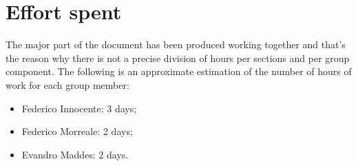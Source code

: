 \documentclass[../ATD.tex]{subfiles}
\begin{document}
    \chapter{Effort spent}\label{ch:effort-spent}
    The major part of the document has been produced working together and that’s the reason why there is not a precise division of hours per sections and per group component.
    The following is an approximate estimation of the number of hours of work for each group member:
    \begin{itemize}
        \item Federico Innocente: 3 days;
        \item Federico Morreale: 2 days;
        \item Evandro Maddes: 2 days.
    \end{itemize}
\end{document}
